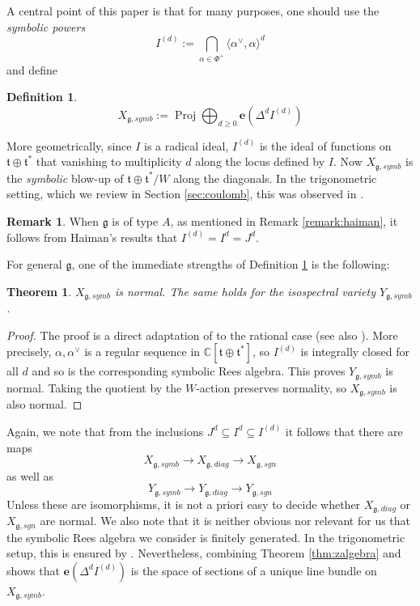 \documentclass{amsart}
\numberwithin{equation}{section}
\newtheorem{theorem}[lemma]{Theorem}%
\theoremstyle{definition}
\newtheorem{remark}[lemma]{Remark}%
\newtheorem{definition}[lemma]{Definition}%
\DeclareMathOperator{\Proj}{\mathrm{Proj}}
\newcommand{\fg}{\mathfrak{g}}
\newcommand{\ft}{\mathfrak{t}}
\newcommand{\C}{{\mathbb C}}
\newcommand{\e}{\mathbf{e}}
\begin{document}
A central point of this paper is that for many purposes, one should use the {\em symbolic powers} 
\begin{equation}
\label{eq:symb}
I^{(d)}:=\bigcap_{\alpha\in \Phi^+} \langle \alpha^\vee,\alpha\rangle^d
\end{equation} and define
\begin{definition}
\label{def:symb}
    $$X_{\fg,symb}:=\Proj \bigoplus_{d\geq 0}\e (\Delta^dI^{(d)})$$
\end{definition}
More geometrically, since $I$ is a radical ideal, $I^{(d)}$ is the ideal of functions on $\ft\oplus\ft^*$ that vanishing to multiplicity $d$ along the locus defined by $I$. 
Now $X_{\fg,symb}$ is the {\em symbolic} blow-up of $\ft\oplus \ft^*/W$ along the diagonals. In the trigonometric setting, which we review in Section \ref{sec:coulomb}, this was observed in \cite{GKO}.
\begin{remark}
    When $\fg$ is of type $A$, as mentioned in Remark \ref{remark:haiman}, it follows from Haiman's results that $I^{(d)}=I^d=J^d$.
\end{remark}
For general $\fg$, one of the immediate strengths of Definition \ref{def:symb} is the following:
\begin{theorem}
\label{thm:normality}
$X_{\fg, symb}$ is normal. The same holds for the isospectral variety $Y_{\fg,symb}$.
\end{theorem}
\begin{proof}
The proof is a direct adaptation of \cite[Theorem 4.7.]{Kivinen} to the rational case (see also \cite[Corollary 3.12.]{GKO}). More precisely, $\alpha,\alpha^\vee$ is a regular sequence in $\C[\ft\oplus\ft^*]$, so $I^{(d)}$ is integrally closed for all $d$ and so is the corresponding symbolic Rees algebra. This proves $Y_{\fg,symb}$ is normal. Taking the quotient by the $W$-action preserves normality, so $X_{\fg,symb}$ is also normal.
\end{proof}
Again, we note that from the inclusions $J^d\subseteq I^d\subseteq I^{(d)}$ it follows that there are maps $$X_{\fg,symb}\to X_{\fg, diag}\to X_{\fg, sgn}$$ as well as 
$$Y_{\fg,symb}\to Y_{\fg, diag}\to Y_{\fg, sgn}$$
Unless these are isomorphisms, it is not a priori easy to decide whether $X_{\fg, diag}$ or $X_{\fg,sgn}$ are normal. We also note that it is neither obvious nor relevant for us that the symbolic Rees algebra we consider is finitely generated. In the trigonometric setup, this is ensured by \cite[Remark 1.16]{GKO}. Nevertheless, combining Theorem \ref{thm:zalgebra} and \cite[Proposition 5.2]{BPW} shows that $\e(\Delta^d I^{(d)})$ is the space of sections of a unique line bundle on $X_{\fg,symb}$.
\end{document}
